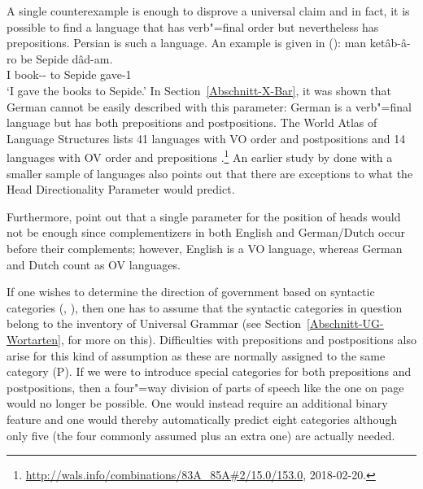 A single counterexample is enough to disprove a universal  claim and in fact, it is possible to
find a language that has verb"=final order but nevertheless has prepositions.
Persian is such a language. An example is given in ():
\ea
\gll man ketâb-â-ro be Sepide dâd-am.\\
     I book-\PL-\RA{} to Sepide gave-1\SG\\
\glt `I gave the books to Sepide.'
\z
In Section~\ref{Abschnitt-X-Bar}, it was shown that German cannot be easily described with this parameter: German is a verb"=final language but has both
prepositions and postpositions. The World Atlas of Language Structures lists 41 languages with VO
order and postpositions and 14 languages with OV order and prepositions \citep{wals-83,wals-85}.\footnote{%
  \url{http://wals.info/combinations/83A_85A\#2/15.0/153.0}, 2018-02-20.
} An earlier study by \citet{Dryer92a} done with a smaller sample of languages also points out that
there are exceptions to what the Head Directionality Parameter would predict. 

Furthermore, \citet[]{GW94a} point out that a single parameter for the position of heads would not be enough since complementizers in both English and German/Dutch
occur before their complements; however, English is a VO language, whereas German and Dutch count as OV languages.

If one wishes to determine the direction of government based on syntactic categories (\citealp[]{GW94a}, \citealp[]{Chomsky2005a}), then one has to assume
that the syntactic categories in question belong to the inventory of Universal Grammar (see Section~\ref{Abschnitt-UG-Wortarten}, for more on this).
Difficulties with prepositions and postpositions also arise for this kind of assumption as these are normally assigned to the same category (P).
If we were to introduce special categories for both prepositions and postpositions, then a four"=way
division of parts of speech like the one on page~\pageref{Tabelle-Merkmalszerlegung-Wortarten} would
no longer be possible. One would instead require an additional binary feature and one would thereby
automatically predict eight categories although only five (the four commonly assumed plus an extra one) are actually needed.

